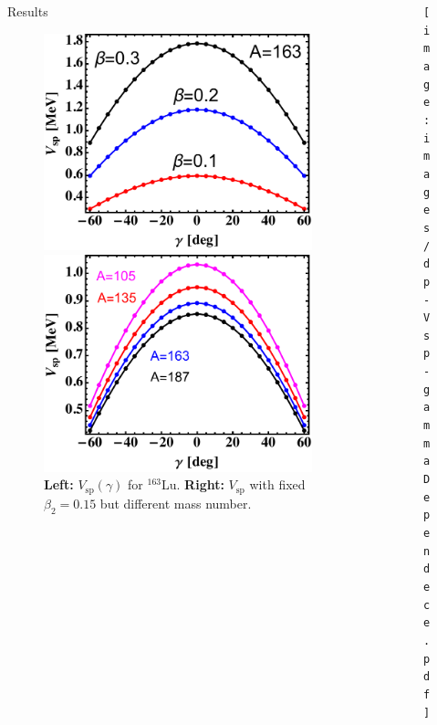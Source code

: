 \documentclass[final]{beamer}
\newlength{\sepwidth}
\newlength{\colwidth}
\newcommand{\separatorcolumn}{\begin{column}{\sepwidth}\end{column}}
\begin{document}
\begin{frame}[t]
\begin{columns}[t]
\begin{column}{\colwidth}
\begin{block}{Results}
   \begin{figure}
     \centering
     \begin{minipage}{.5\textwidth}
  \centering
  \includegraphics[scale=1]{images/VSp_gammaBehavior.pdf}
\end{minipage}%
\begin{minipage}{.5\textwidth}
  \centering
 \includegraphics[scale=1]{images/VSp_gammaBehavior-A.pdf}
\end{minipage}
     \caption{\textbf{Left:} $V_\text{sp}(\gamma)$ for $^{163}$Lu. \textbf{Right:} $V_\text{sp}$ with fixed $\beta_2=0.15$ but different mass number.}
     \label{vsp-behavior-gamma}
 \end{figure}
  \end{block}
\end{column}
\separatorcolumn
\begin{column}{\colwidth}
 \begin{figure}
     \centering
     \texttt{[image: images/dp-Vsp-gammaDependece.pdf]}
     

\end{figure}
\end{column}
\end{columns}
\end{frame}
\end{document}
